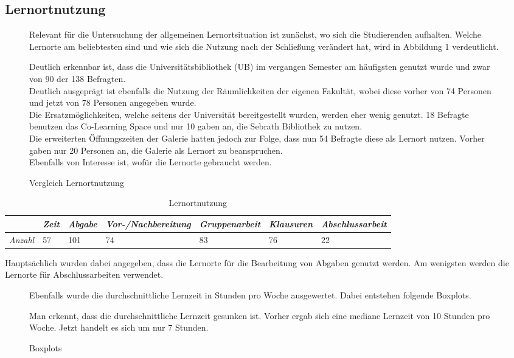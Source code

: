 \documentclass[11pt, a4paper]{article}
\begin{document}
\subsection{Lernortnutzung}
\begin{figure}[h]
Relevant für die Untersuchung der allgemeinen Lernortsituation ist zunächst, wo sich die Studierenden aufhalten. Welche Lernorte am beliebtesten sind und wie sich die Nutzung nach der Schließung verändert hat, wird in Abbildung 1 verdeutlicht.

 
 \caption{Vergleich Lernortnutzung}
\leavevmode

Deutlich erkennbar ist, dass die Universitätsbibliothek (UB) im vergangen Semester am häufigsten genutzt wurde und zwar von 90 der 138 Befragten.\\
Deutlich ausgeprägt ist ebenfalls die Nutzung der Räumlichkeiten der eigenen Fakultät, wobei diese vorher von 74 Personen und jetzt von 78 Personen angegeben wurde. \\
Die Ersatzmöglichkeiten, welche seitens der Universität bereitgestellt wurden, werden eher wenig genutzt. 18 Befragte benutzen das Co-Learning Space und nur 10 gaben an, die Sebrath Bibliothek zu nutzen.\\
Die erweiterten Öffnungszeiten der Galerie hatten jedoch zur Folge, dass nun 54 Befragte diese als Lernort nutzen. Vorher gaben nur 20 Personen an, die Galerie als Lernort zu beanspruchen.\\


Ebenfalls von Interesse ist, wofür die Lernorte gebraucht werden. 

\end{figure}
\begin{table}[h]
	\begin{tabular}{l|llllll}
		& \textit{Zeit} & \textit{Abgabe} & \textit{Vor-/Nachbereitung} & \textit{Gruppenarbeit} & \textit{Klausuren} & \textit{Abschlussarbeit} \\ \hline
		\textit{Anzahl} & 57            & 101             & 74                          & 83                     & 76                 & 22                      
	\end{tabular}
		\caption{Lernortnutzung}
\end{table}

Hauptsächlich wurden dabei angegeben, dass die Lernorte für die Bearbeitung von Abgaben genutzt werden. Am wenigsten werden die Lernorte für Abschlussarbeiten verwendet.
\leavevmode

\begin{figure}[htp]
	Ebenfalls wurde die durchschnittliche Lernzeit in Stunden pro Woche ausgewertet. Dabei entstehen folgende Boxplots.\\
	\vspace{-1.5cm}
	{\centering} 
	\vspace{0cm}
	\caption{Boxplots}
	\vspace{0.5cm}
	Man erkennt, dass die durchschnittliche Lernzeit gesunken ist. Vorher ergab sich eine mediane Lernzeit von 10 Stunden pro Woche. Jetzt handelt es sich um nur 7 Stunden.
\end{figure}
\end{document}
